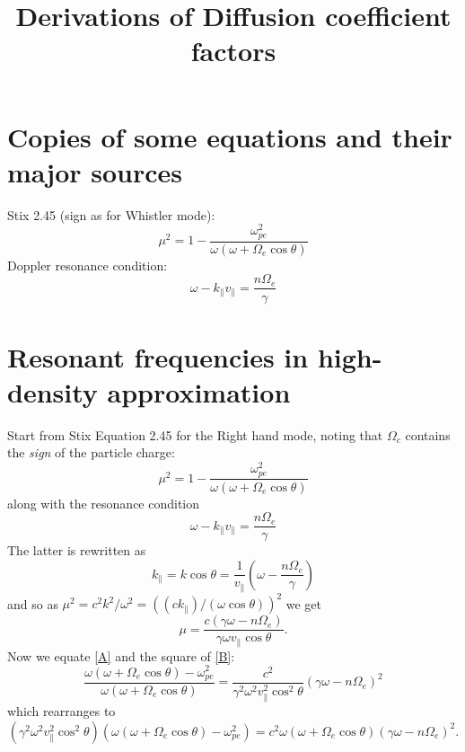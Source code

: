 \documentclass[]{article}
\title{Derivations of Diffusion coefficient factors}
\begin{document}
\tableofcontents

\section{Copies of some equations and their major sources}
Stix 2.45 (sign as for Whistler mode):
\begin{equation}
\mu^2 =  1 - \frac {\omega_{pe}^2}{\omega(\omega + \Omega_e \cos\theta)}
\end{equation}
Doppler resonance condition:
\begin{equation}
\omega -k_\parallel v_\parallel = \frac{n \Omega_e}{\gamma}
\end{equation}

\section{Resonant frequencies in high-density approximation}
Start from Stix Equation 2.45 for the Right hand mode, noting that $\Omega_c$ contains the \emph{sign} of the particle charge:
\begin{equation}\label{A}
\mu^2 =  1 - \frac {\omega_{pe}^2}{\omega(\omega + \Omega_e \cos\theta)}
\end{equation}
along with the resonance condition
\begin{equation}
\omega -k_\parallel v_\parallel = \frac{n \Omega_e}{\gamma}
\end{equation}
The latter is rewritten as
\begin{equation}
k_\parallel = k \cos\theta = \frac{1}{v_\parallel} \left(\omega - \frac{n \Omega_e}{\gamma} \right) \end{equation}
and so as $ \mu^2 = c^2 k^2 /\omega^2 = ((c k_\parallel)/( \omega \cos\theta))^2$ we get
\begin{equation}\label{B}
\mu = \frac{c ( \gamma \omega - n \Omega_e)}{\gamma\omega v_\parallel \cos\theta}.
\end{equation}
Now we equate \ref{A} and the square of \ref{B}:
\begin{equation}
\frac{\omega(\omega + \Omega_e \cos\theta) - \omega_{pe}^2}{\omega(\omega + \Omega_e \cos\theta)} = \frac{c^2}{\gamma^2 \omega^2 v_\parallel^2 \cos^2\theta} (\gamma \omega - n \Omega_e)^2 \end{equation}
which rearranges to
\begin{equation}
(\gamma^2 \omega^2 v_\parallel^2 \cos^2\theta) (\omega(\omega + \Omega_e \cos\theta) - \omega_{pe}^2) = c^2 \omega(\omega + \Omega_e \cos\theta)(\gamma \omega - n \Omega_e)^2. \end{equation}
\end{document}
